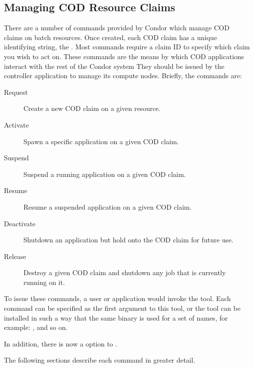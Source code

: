 \subsection{\label{sec:cod-managing-claims}
Managing COD Resource Claims}

There are a number of commands provided by Condor which manage COD
claims on batch resources.
Once created, each COD claim has a unique identifying string, the
.
Most commands require a claim ID to specify which claim you wish to
act on. 
These commands are the means by which COD applications interact with
the rest of the Condor system
They should be issued by the controller application to manage its
compute nodes.
Briefly, the commands are:

\begin{description}

\item [Request] Create a new COD claim on a given resource.

\item [Activate] Spawn a specific application on a given COD claim.

\item [Suspend] Suspend a running application on a given COD claim.

\item [Resume] Resume a suspended application on a given COD claim.

\item [Deactivate] Shutdown an application but hold onto the COD claim
  for future use.

\item [Release] Destroy a given COD claim and shutdown any job that is
  currently running on it.

\end{description}

To issue these commands, a user or application would invoke the 
 tool.
Each command can be specified as the first argument to this tool, or
the  tool can be installed in such a way that the same
binary is used for a set of names, for example: ,
 and so on.

In addition, there is now a  option to .

The following sections describe each command in greater detail.

